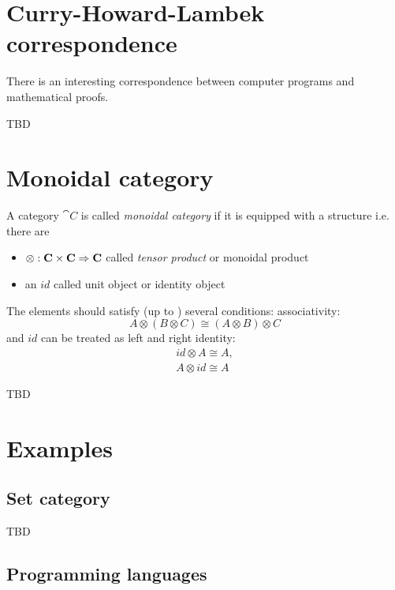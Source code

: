\section{Curry-Howard-Lambek correspondence}
There is an interesting correspondence between computer programs and
mathematical proofs.

TBD

\section{Monoidal category}

\begin{definition}
\label{def:monoidal_category}
A category $\cat{C}$ is called \textit{monoidal category} if it is
equipped with a  structure i.e. there are
\begin{itemize}
\item {} $\otimes: \mathbf{C} \times \mathbf{C} \Rightarrow
  \mathbf{C}$ called \textit{tensor product} or monoidal product
\item an  $id$ called unit object or identity object
\end{itemize}

The elements should satisfy (up to ) several conditions:
associativity: 
\begin{equation}
A \otimes \left( B \otimes C \right) \cong
  \left( A \otimes B \right) \otimes C
\nonumber
\end{equation}
and $id$ can be treated as left and right identity: 
\begin{eqnarray}
id \otimes A \cong A, 
\nonumber \\
A \otimes id \cong A
\nonumber
\end{eqnarray}
\end{definition}
TBD

\section{Examples}

\subsection{\textbf{Set} category}
TBD

\subsection{Programming languages}

